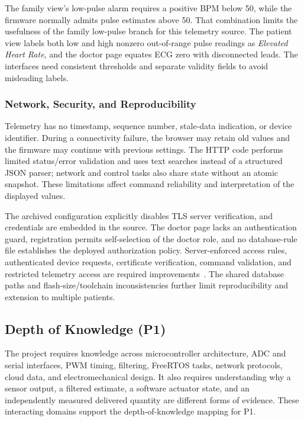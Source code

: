 The family view's low-pulse alarm requires a positive BPM below 50, while the firmware normally admits pulse estimates above 50. That combination limits the usefulness of the family low-pulse branch for this telemetry source. The patient view labels both low and high nonzero out-of-range pulse readings as \emph{Elevated Heart Rate}, and the doctor page equates ECG zero with disconnected leads. The interfaces need consistent thresholds and separate validity fields to avoid misleading labels.

\subsubsection{Network, Security, and Reproducibility}
Telemetry has no timestamp, sequence number, stale-data indication, or device identifier. During a connectivity failure, the browser may retain old values and the firmware may continue with previous settings. The HTTP code performs limited status/error validation and uses text searches instead of a structured JSON parser; network and control tasks also share state without an atomic snapshot. These limitations affect command reliability and interpretation of the displayed values.

The archived configuration explicitly disables TLS server verification, and credentials are embedded in the source. The doctor page lacks an authentication guard, registration permits self-selection of the doctor role, and no database-rule file establishes the deployed authorization policy. Server-enforced access rules, authenticated device requests, certificate verification, command validation, and restricted telemetry access are required improvements~\cite{firebaserules,idfhttp}. The shared database paths and flash-size/toolchain inconsistencies further limit reproducibility and extension to multiple patients.

\subsection{Depth of Knowledge (P1)}
The project requires knowledge across microcontroller architecture, ADC and serial interfaces, PWM timing, filtering, FreeRTOS tasks, network protocols, cloud data, and electromechanical design. It also requires understanding why a sensor output, a filtered estimate, a software actuator state, and an independently measured delivered quantity are different forms of evidence. These interacting domains support the depth-of-knowledge mapping for P1.

